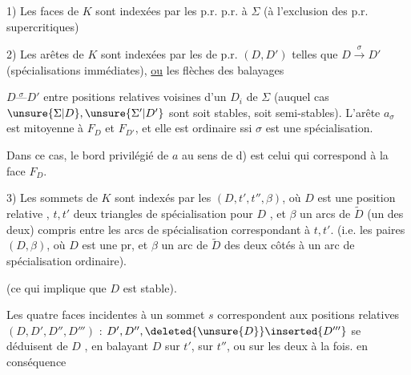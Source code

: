  1) Les faces de $K$ sont indexées par les p.r. p.r. à $\Sigma$ (à l'exclusion des p.r.  supercritiques)

2) Les arêtes de $K$ sont indexées par les  de p.r.  $(D,D')$ telles que $D\overset\sigma\longrightarrow D'$ (spécialisations immédiates),  \uline{ou} les flèches des balayages 


$D\overset\sigma{\text{---}}D'$ entre positions relatives voisines d'un $D_i$ \deleted{$\in\Sigma$} de $\Sigma$ (auquel cas $\unsure{\Sigma|D},\unsure{\Sigma'|D'}$ sont soit stables, soit semi-stables). L'arête $a_\sigma$ est mitoyenne à $F_D$ et $F_{D'}$, et elle est ordinaire ssi $\sigma$ est une spécialisation.

Dans ce cas, le bord privilégié de $a$ au sens de d) est celui qui correspond à la face $F_D$.

3) Les sommets  de $K$ sont indexés par les  $(D,t',t'',\beta)$, où $D$ est une position relative , $t,t'$ deux triangles de spécialisation pour $D$ , et $\beta$  un  arcs de $\widetilde D$ (un des deux) compris entre les arcs de spécialisation  correspondant à $t,t'$. (i.e. les  paires $(D,\beta)$, où $D$ est une pr, et $\beta$ un arc de $\widetilde D$   des deux côtés à un arc de spécialisation ordinaire).


(ce qui implique que $D$ est stable).

 Les quatre faces incidentes à un sommet $s$ correspondent aux positions relatives $(D,D',D'',D''')$ : $D',D'',\deleted{\unsure{D}}\inserted{D'''}$ se déduisent de $D$ , en balayant $D$ sur $t'$, \deleted{$\unsure{\Sigma}$} sur $t''$,  ou sur les deux à la fois.  en conséquence

